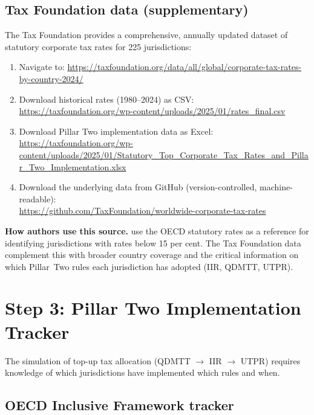 \documentclass[12pt,a4paper]{article}
\begin{document}
\subsection{Tax Foundation data (supplementary)}

The Tax Foundation provides a comprehensive, annually updated dataset of statutory corporate tax rates for 225 jurisdictions:

\begin{enumerate}
\item Navigate to: \url{https://taxfoundation.org/data/all/global/corporate-tax-rates-by-country-2024/}
\item Download historical rates (1980--2024) as CSV:\\
\url{https://taxfoundation.org/wp-content/uploads/2025/01/rates_final.csv}
\item Download Pillar Two implementation data as Excel:\\
\url{https://taxfoundation.org/wp-content/uploads/2025/01/Statutory_Top_Corporate_Tax_Rates_and_Pillar_Two_Implementation.xlsx}
\item Download the underlying data from GitHub (version-controlled, machine-readable):\\
\url{https://github.com/TaxFoundation/worldwide-corporate-tax-rates}
\end{enumerate}

\textbf{How authors use this source.}
\textcite{barake2022} use the OECD statutory rates as a reference for identifying jurisdictions with rates below 15 per cent.
The Tax Foundation data complement this with broader country coverage and the critical information on which Pillar~Two rules each jurisdiction has adopted (IIR, QDMTT, UTPR).


\section{Step 3: Pillar Two Implementation Tracker}\label{sec:tracker}

The simulation of top-up tax allocation (QDMTT $\rightarrow$ IIR $\rightarrow$ UTPR) requires knowledge of which jurisdictions have implemented which rules and when.

\subsection{OECD Inclusive Framework tracker}
\end{document}
